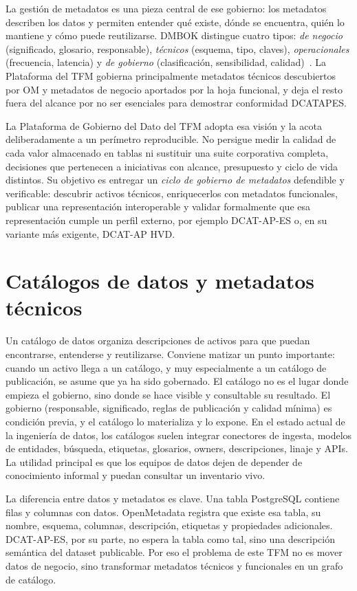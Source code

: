 La gestión de metadatos es una pieza central de ese gobierno: los metadatos describen los datos y permiten entender qué existe, dónde se encuentra, quién lo mantiene y cómo puede reutilizarse. \ac{DMBOK} distingue cuatro tipos: \emph{de negocio} (significado, glosario, responsable), \emph{técnicos} (esquema, tipo, claves), \emph{operacionales} (frecuencia, latencia) y \emph{de gobierno} (clasificación, sensibilidad, calidad)~\cite{damaDmbok}. La Plataforma del TFM gobierna principalmente metadatos técnicos descubiertos por \ac{OM} y metadatos de negocio aportados por la hoja funcional, y deja el resto fuera del alcance por no ser esenciales para demostrar conformidad \ac{DCATAPES}.

La Plataforma de Gobierno del Dato del TFM adopta esa visión y la acota deliberadamente a un perímetro reproducible. No persigue medir la calidad de cada valor almacenado en tablas ni sustituir una suite corporativa completa, decisiones que pertenecen a iniciativas con alcance, presupuesto y ciclo de vida distintos. Su objetivo es entregar un \emph{ciclo de gobierno de metadatos} defendible y verificable: descubrir activos técnicos, enriquecerlos con metadatos funcionales, publicar una representación interoperable y validar formalmente que esa representación cumple un perfil externo, por ejemplo DCAT-AP-ES o, en su variante más exigente, DCAT-AP HVD.

\section{Catálogos de datos y metadatos técnicos}

Un catálogo de datos organiza descripciones de activos para que puedan encontrarse, entenderse y reutilizarse. Conviene matizar un punto importante: cuando un activo llega a un catálogo, y muy especialmente a un catálogo de publicación, se asume que ya ha sido gobernado. El catálogo no es el lugar donde empieza el gobierno, sino donde se hace visible y consultable su resultado. El gobierno (responsable, significado, reglas de publicación y calidad mínima) es condición previa, y el catálogo lo materializa y lo expone. En el estado actual de la ingeniería de datos, los catálogos suelen integrar conectores de ingesta, modelos de entidades, búsqueda, etiquetas, glosarios, owners, descripciones, linaje y APIs. La utilidad principal es que los equipos de datos dejen de depender de conocimiento informal y puedan consultar un inventario vivo.

La diferencia entre datos y metadatos es clave. Una tabla PostgreSQL contiene filas y columnas con datos. OpenMetadata registra que existe esa tabla, su nombre, esquema, columnas, descripción, etiquetas y propiedades adicionales. DCAT-AP-ES, por su parte, no espera la tabla como tal, sino una descripción semántica del dataset publicable. Por eso el problema de este TFM no es mover datos de negocio, sino transformar metadatos técnicos y funcionales en un grafo de catálogo.

